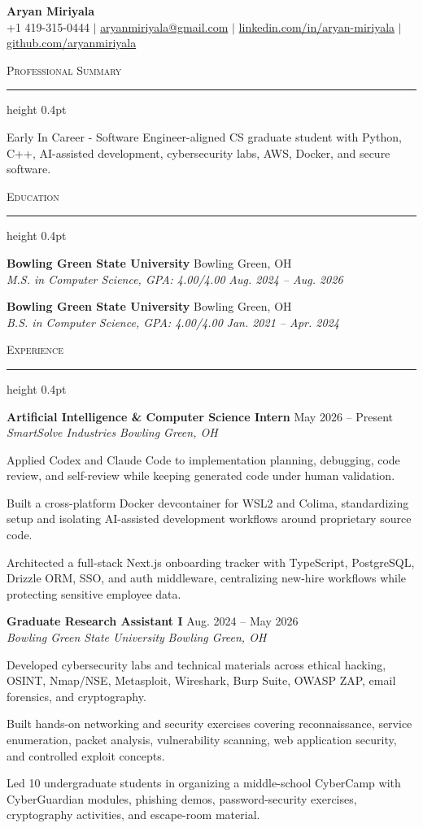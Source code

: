 \documentclass[letterpaper,11pt]{article}
\newcommand{\resumesection}[1]{%
  \par\vspace{2pt}%
  {\large\scshape #1}\par\vspace{2pt}%
  \hrule height 0.4pt\vspace{2pt}%
}
\newcommand{\resumeSubheading}[4]{
  \textbf{#1} \hfill #2\\
  \textit{#3} \hfill \textit{#4}
}
\begin{document}
\begin{center}
  {\LARGE \textbf{Aryan Miriyala}}\\[-1pt]
  \small
  +1 419-315-0444 $|$
  \href{mailto:aryanmiriyala@gmail.com}{aryanmiriyala@gmail.com} $|$
  \href{https://www.linkedin.com/in/aryan-miriyala-7788a21b6/}{linkedin.com/in/aryan-miriyala} $|$
  \href{https://github.com/aryanmiriyala}{github.com/aryanmiriyala}
\end{center}\vspace{-10pt}

\resumesection{Professional Summary}
Early In Career - Software Engineer-aligned CS graduate student with Python, C++, AI-assisted development, cybersecurity labs, AWS, Docker, and secure software.

\resumesection{Education}
\resumeSubheading
{Bowling Green State University}{Bowling Green, OH}
{M.S. in Computer Science, GPA: 4.00/4.00}{Aug. 2024 -- Aug. 2026}

\resumeSubheading
{Bowling Green State University}{Bowling Green, OH}
{B.S. in Computer Science, GPA: 4.00/4.00}{Jan. 2021 -- Apr. 2024}

\resumesection{Experience}
\resumeSubheading
{Artificial Intelligence \& Computer Science Intern}{May 2026 -- Present}
{SmartSolve Industries}{Bowling Green, OH}
\begin{tightitemize}
  \item Applied Codex and Claude Code to implementation planning, debugging, code review, and self-review while keeping generated code under human validation.
  \item Built a cross-platform Docker devcontainer for WSL2 and Colima, standardizing setup and isolating AI-assisted development workflows around proprietary source code.
  \item Architected a full-stack Next.js onboarding tracker with TypeScript, PostgreSQL, Drizzle ORM, SSO, and auth middleware, centralizing new-hire workflows while protecting sensitive employee data.
\end{tightitemize}

\resumeSubheading
{Graduate Research Assistant I}{Aug. 2024 -- May 2026}
{Bowling Green State University}{Bowling Green, OH}
\begin{tightitemize}
  \item Developed cybersecurity labs and technical materials across ethical hacking, OSINT, Nmap/NSE, Metasploit, Wireshark, Burp Suite, OWASP ZAP, email forensics, and cryptography.
  \item Built hands-on networking and security exercises covering reconnaissance, service enumeration, packet analysis, vulnerability scanning, web application security, and controlled exploit concepts.
  \item Led 10 undergraduate students in organizing a middle-school CyberCamp with CyberGuardian modules, phishing demos, password-security exercises, cryptography activities, and escape-room material.
\end{tightitemize}
\end{document}
